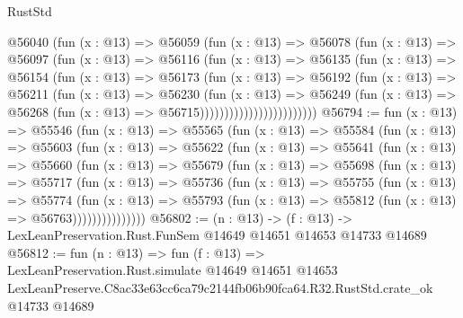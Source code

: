 \begin{lexlean}{RustStd}
\begin{coremodule}
                        @56040
                          (fun (x : @13) =>
                          @56059
                            (fun (x : @13) =>
                            @56078
                              (fun (x : @13) =>
                              @56097
                                (fun (x : @13) =>
                                @56116
                                  (fun (x : @13) =>
                                  @56135
                                    (fun (x : @13) =>
                                    @56154
                                      (fun (x : @13) =>
                                      @56173
                                        (fun (x : @13) =>
                                        @56192
                                          (fun (x : @13) =>
                                          @56211
                                            (fun (x : @13) =>
                                            @56230
                                              (fun (x : @13) =>
                                              @56249
                                                (fun (x : @13) =>
                                                @56268
                                                  (fun (x : @13) => @56715))))))))))))))))))))))))
@56794 := fun (x : @13) =>
  @55546
    (fun (x : @13) =>
    @55565
      (fun (x : @13) =>
      @55584
        (fun (x : @13) =>
        @55603
          (fun (x : @13) =>
          @55622
            (fun (x : @13) =>
            @55641
              (fun (x : @13) =>
              @55660
                (fun (x : @13) =>
                @55679
                  (fun (x : @13) =>
                  @55698
                    (fun (x : @13) =>
                    @55717
                      (fun (x : @13) =>
                      @55736
                        (fun (x : @13) =>
                        @55755
                          (fun (x : @13) =>
                          @55774
                            (fun (x : @13) =>
                            @55793 (fun (x : @13) => @55812 (fun (x : @13) => @56763)))))))))))))))
@56802 := (n : @13) ->
  (f : @13) -> LexLeanPreservation.Rust.FunSem @14649 @14651 @14653 @14733 @14689
@56812 := fun (n : @13) =>
  fun (f : @13) =>
  LexLeanPreservation.Rust.simulate
    @14649
    @14651
    @14653
    LexLeanPreserve.C8ac33e63cc6ca79c2144fb06b90fca64.R32.RustStd.crate_ok
    @14733
    @14689
\end{coremodule}
\end{lexlean}
